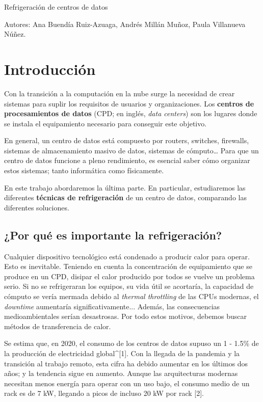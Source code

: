 
Refrigeración de centros de datos

Autores: Ana Buendía Ruiz-Azuaga, Andrés Millán Muñoz, Paula Villanueva Núñez.


\section*{Introducción}

Con la transición a la computación en la nube surge la necesidad de crear sistemas para suplir los requisitos de usuarios y organizaciones. Los \textbf{centros de procesamientos de datos} (CPD; en inglés, \textit{data centers}) son los lugares donde se instala el equipamiento necesario para conseguir este objetivo.

En general, un centro de datos está compuesto por routers, switches, firewalls, sistemas de almacenamiento masivo de datos, sistemas de cómputo… Para que un centro de datos funcione a pleno rendimiento, es esencial saber cómo organizar estos sistemas; tanto informática como físicamente.

En este trabajo abordaremos la última parte. En particular, estudiaremos las diferentes \textbf{técnicas de refrigeración} de un centro de datos, comparando las diferentes soluciones.

\subsection*{¿Por qué es importante la refrigeración?}


Cualquier dispositivo tecnológico está condenado a producir calor para operar. Esto es inevitable. Teniendo en cuenta la concentración de equipamiento que se produce en un CPD, disipar el calor producido por todos se vuelve un problema serio. Si no se refrigeraran los equipos, su vida útil se acortaría, la capacidad de cómputo se vería mermada debido al \textit{thermal throttling} de las CPUs modernas, el \textit{downtime} aumentaría significativamente... Además, las consecuencias medioambientales serían desastrosas. Por todo estos motivos, debemos buscar métodos de transferencia de calor.

Se estima que, en 2020, el consumo de los centros de datos supuso un 1 - 1.5\% de la producción de electricidad global^[1]. Con la llegada de la pandemia y la transición al trabajo remoto, esta cifra ha debido aumentar en los últimos dos años; y la tendencia sigue en aumento. Aunque las arquitecturas modernas necesitan menos energía para operar con un uso bajo, el consumo medio de un rack es de 7 kW, llegando a picos de incluso 20 kW por rack [2].

